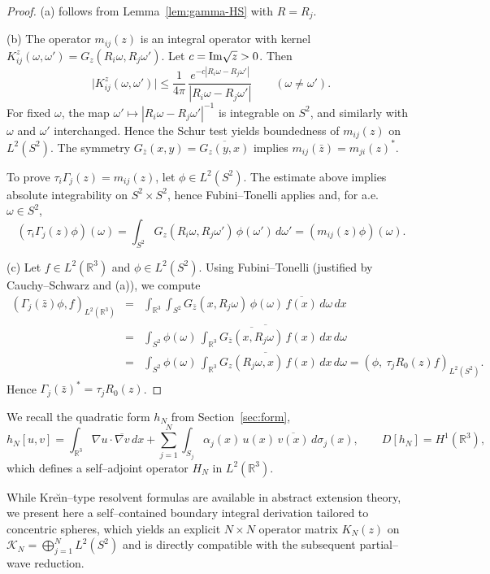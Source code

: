 \documentclass[a4paper,11pt]{article}
\numberwithin{equation}{section}
\def\re{\mathbb{R}}
\renewcommand{\Im}{\text{{\rm Im}}}
\theoremstyle{definition}
\theoremstyle{remark}
\begin{document}
\begin{proof}
(a) follows from Lemma~\ref{lem:gamma-HS} with $R=R_j$.

(b) The operator $m_{ij}(z)$ is an integral operator with kernel
$K_{ij}^z(\omega,\omega')=G_z(R_i\omega,R_j\omega')$.
Let $c=\Im\sqrt z>0$.
Then
$$
\bigl|K_{ij}^z(\omega,\omega')\bigr|
\le
\frac{1}{4\pi}\,\frac{e^{-c|R_i\omega-R_j\omega'|}}{|R_i\omega-R_j\omega'|}
\qquad(\omega\ne\omega').
$$
For fixed $\omega$, the map $\omega'\mapsto |R_i\omega-R_j\omega'|^{-1}$ is
integrable on $S^2$, and similarly with $\omega$ and $\omega'$ interchanged.
Hence the Schur test yields boundedness of $m_{ij}(z)$ on $L^2(S^2)$.
The symmetry $G_{\bar z}(x,y)=\overline{G_z(y,x)}$ implies
$m_{ij}(\bar z)=m_{ji}(z)^{\ast}$.

To prove $\tau_i\Gamma_j(z)=m_{ij}(z)$, let $\phi\in L^2(S^2)$.
The estimate above implies absolute integrability on $S^2\times S^2$, hence
Fubini--Tonelli applies and, for a.e.\ $\omega\in S^2$,
$$
(\tau_i\Gamma_j(z)\phi)(\omega)
=
\int_{S^2}G_z(R_i\omega,R_j\omega')\,\phi(\omega')\,d\omega'
=
(m_{ij}(z)\phi)(\omega).
$$

(c) Let $f\in L^2(\re^3)$ and $\phi\in L^2(S^2)$.
Using Fubini--Tonelli (justified by Cauchy--Schwarz and (a)), we compute
\begin{eqnarray*}
(\Gamma_j(\bar z)\phi,f)_{L^2(\re^3)}
&=&\int_{\re^3}\int_{S^2}
   G_{\bar z}(x,R_j\omega)\,\phi(\omega)\,
   \overline{f(x)}\,d\omega\,dx \\
&=&\int_{S^2}\phi(\omega)\,
   \overline{\int_{\re^3}
   \overline{G_{\bar z}(x,R_j\omega)}\,f(x)\,dx}\,d\omega \\
&=&\int_{S^2}\phi(\omega)\,
   \overline{\int_{\re^3}
   G_{z}(R_j\omega,x)\,f(x)\,dx}\,d\omega
=
(\phi,\ \tau_j R_0(z)f)_{L^2(S^2)} .
\end{eqnarray*}
Hence $\Gamma_j(\bar z)^{\ast}=\tau_j R_0(z)$.
\end{proof}

We recall the quadratic form $h_N$ from Section~\ref{sec:form},
\begin{equation}\label{eq:hN-recall}
h_N[u,v]
=
\int_{\re^3}\nabla u\cdot\overline{\nabla v}\,dx
+
\sum_{j=1}^{N}\int_{S_j}\alpha_j(x)\,u(x)\,\overline{v(x)}\,d\sigma_j(x),
\qquad
D[h_N]=H^1(\re^3),
\end{equation}
which defines a self--adjoint operator $H_N$ in $L^2(\re^3)$.

While Kre\u{\i}n--type resolvent formulas are available in abstract extension
theory, we present here a self--contained boundary integral derivation tailored
to concentric spheres, which yields an explicit $N\times N$ operator matrix
$K_N(z)$ on $\mathcal K_N=\bigoplus_{j=1}^N L^2(S^2)$ and is directly compatible with the
subsequent partial--wave reduction.
%
\end{document}
